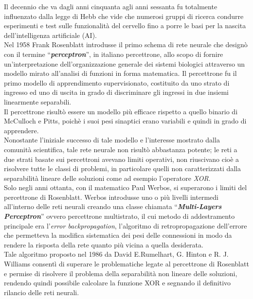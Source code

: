 \documentclass[12pt,a4paper,oneside]{book}
\begin{document}
	    Il decennio che va dagli anni cinquanta agli anni sessanta fu totalmente influenzato dalla legge di Hebb che vide che numerosi gruppi di ricerca condurre esperimenti e test sulle funzionalità del cervello fino a porre le basi per la nascita dell'intelligenza artificiale (AI).\\
	    Nel 1958 Frank Rosenblatt introdusse il primo schema di rete neurale che designò con il termine ``\textbf{\emph{perceptron}}'', in italiano percettrone, allo scopo di fornire un'interpretazione dell'organizzazione generale dei sistemi biologici attraverso un modello mirato all'analisi di funzioni in forma matematica. Il percettrone fu il primo modello di apprendimento supervisionato, costituito da uno strato di ingresso ed uno di uscita in grado di discriminare gli ingressi in due insiemi linearmente separabili.\\
	    Il percettrone risultò essere un modello più efficace rispetto a quello binario di McCulloch e Pitts, poichè i suoi pesi sinaptici erano variabili e quindi in grado di apprendere.\\
		Nonostante l'iniziale successo di tale modello e l'interesse mostrato dalla comunità scientifica, tale rete neurale non risultò abbastanza potente; le reti a due strati basate sui percettroni avevano limiti operativi, non riuscivano cioè a risolvere tutte le classi di problemi, in particolare quelli non caratterizzati dalla separabilità lineare delle soluzioni come ad esempio l'operatore \emph{XOR}.\\
		Solo negli anni ottanta, con il matematico Paul Werbos, si superarono i limiti del percettrone di Rosenblatt.  Werbos introdusse uno o più livelli intermedi all'interno delle reti neurali creando una classe chiamata  ``\textbf{\emph{Multi-Layers Perceptron}}'' ovvero percettrone multistrato, il cui metodo di addestramento principale era l'\emph{error backpropagation}, l'algoritmo di retropropagazione dell'errore che permetteva la modifica sistematica dei pesi delle connessioni in modo da rendere la risposta della rete quanto più vicina a quella desiderata.\\
		Tale algoritmo proposto nel 1986 da David E.Rumelhart, G. Hinton e R. J. Williams consentì di superare le problematiche legate al percettrone di Rosenblatt e permise di risolvere il problema della separabilità non lineare delle soluzioni, rendendo quindi possibile calcolare la funzione XOR e segnando il definitivo rilancio delle reti neurali.
		
		
	
\end{document}
